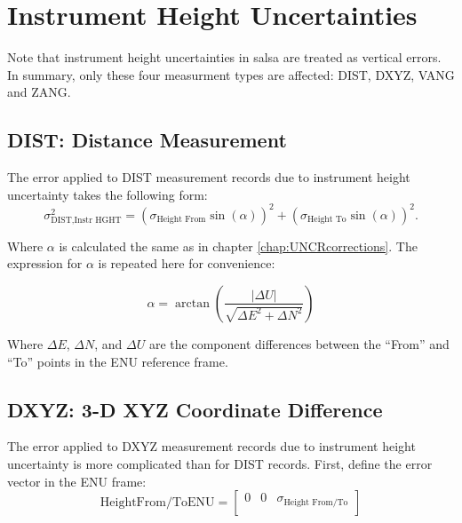 \section{Instrument Height Uncertainties}
Note that instrument height uncertainties in \textsf{salsa} are treated as vertical errors. In summary, only these four measurment types are affected: DIST, DXYZ, VANG and ZANG.

\subsection{DIST: Distance Measurement}
The error applied to DIST measurement records due to instrument height uncertainty takes the following form:
\begin{equation}
\sigma_{\text{DIST,Instr HGHT}}^2=(\sigma_{\text{Height From}}\sin(\alpha))^2+(\sigma_{\text{Height To}}\sin(\alpha))^2.
\end{equation}

Where $\alpha$ is calculated the same as in chapter \ref{chap:UNCRcorrections}. The expression for $\alpha$ is repeated here for convenience:

\begin{equation}
    \alpha=\arctan(\frac{| \Delta U |}{\sqrt{\Delta E^2 + \Delta N^2}})
\end{equation}

Where $\Delta E$, $\Delta N$, and $\Delta U$ are the component differences between the ``From'' and ``To'' points in the ENU reference frame.

\subsection{DXYZ: 3-D XYZ Coordinate Difference}
The error applied to DXYZ measurement records due to instrument height uncertainty is more complicated than for DIST records. First, define the error vector in the ENU frame:
\begin{equation}\label{eq:heightENU} %
    \text{HeightFrom/ToENU} = \left[ \begin{array}{ccc} 0 & 0 & \sigma_{\text{Height From/To}} \\ \end{array} \right]
\end{equation}

